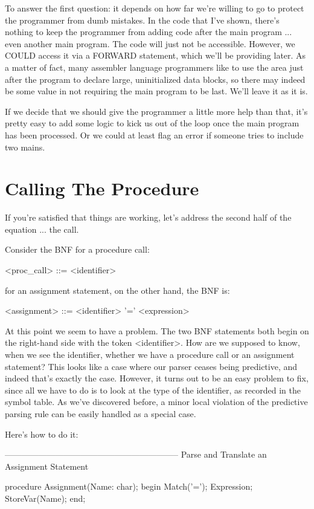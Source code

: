 \documentclass[float=false, crop=false]{standalone}
\begin{document}
To answer the first question: it depends on how far we're willing to go to
protect the programmer from dumb mistakes. In the code that I've shown, there's
nothing to keep the programmer from adding code after the main program ... even
another main program. The code will just not be accessible. However, we COULD
access it via a FORWARD statement, which we'll be providing later. As a matter
of fact, many assembler language programmers like to use the area just after the
program to declare large, uninitialized data blocks, so there may indeed be some
value in not requiring the main program to be last. We'll leave it as it is.

If we decide that we should give the programmer a little more help than that,
it's pretty easy to add some logic to kick us out of the loop once the main
program has been processed. Or we could at least flag an error if someone tries
to include two mains.


\section{Calling The Procedure}

If you're satisfied that things are working, let's address the second half of
the equation ... the call.

Consider the BNF for a procedure call:


     <proc_call> ::= <identifier>


for an assignment statement, on the other hand, the BNF is:


     <assignment> ::= <identifier> '=' <expression>


At this point we seem to have a problem. The two BNF statements both begin on
the right-hand side with the token <identifier>. How are we supposed to know,
when we see the identifier, whether we have a procedure call or an assignment
statement? This looks like a case where our parser ceases being predictive, and
indeed that's exactly the case. However, it turns out to be an easy problem to
fix, since all we have to do is to look at the type of the identifier, as
recorded in the symbol table. As we've discovered before, a minor local
violation of the predictive parsing rule can be easily handled as a special
case.

Here's how to do it:


{--------------------------------------------------------------}
{ Parse and Translate an Assignment Statement }

procedure Assignment(Name: char);
begin
     Match('=');
     Expression;
     StoreVar(Name);
end;
\end{document}

